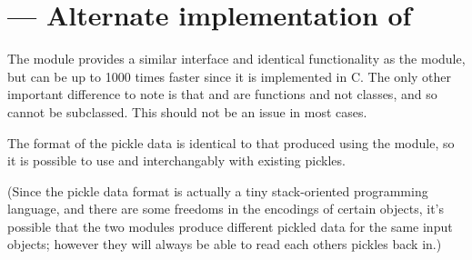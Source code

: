 \section{ ---
         Alternate implementation of }



The  module provides a similar interface and identical
functionality as the  module,
but can be up to 1000 times faster since it is implemented in C.  The
only other important difference to note is that 
and  are functions and not classes, and so
cannot be subclassed.  This should not be an issue in most cases.

The format of the pickle data is identical to that produced using the
 module, so it is possible to use  and
 interchangably with existing pickles.

(Since the pickle data format is actually a tiny stack-oriented
programming language, and there are some freedoms in the encodings of
certain objects, it's possible that the two modules produce different
pickled data for the same input objects; however they will always be
able to read each others pickles back in.)
